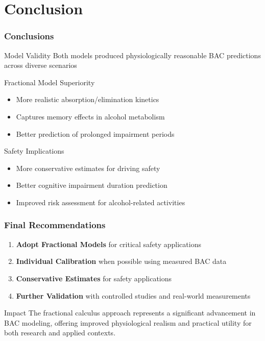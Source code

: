 \documentclass{beamer}
\begin{document}
\section{Conclusion}

\begin{frame}
\frametitle{Conclusions}
\begin{block}{Model Validity}
Both models produced physiologically reasonable BAC predictions across diverse scenarios
\end{block}

\begin{block}{Fractional Model Superiority}
\begin{itemize}
    \item More realistic absorption/elimination kinetics
    \item Captures memory effects in alcohol metabolism
    \item Better prediction of prolonged impairment periods
\end{itemize}
\end{block}

\begin{block}{Safety Implications}
\begin{itemize}
    \item More conservative estimates for driving safety
    \item Better cognitive impairment duration prediction
    \item Improved risk assessment for alcohol-related activities
\end{itemize}
\end{block}
\end{frame}

\begin{frame}
\frametitle{Final Recommendations}
\begin{enumerate}
    \item \textbf{Adopt Fractional Models} for critical safety applications
    \item \textbf{Individual Calibration} when possible using measured BAC data
    \item \textbf{Conservative Estimates} for safety applications
    \item \textbf{Further Validation} with controlled studies and real-world measurements
\end{enumerate}

\vspace{0.5cm}
\begin{alertblock}{Impact}
The fractional calculus approach represents a significant advancement in BAC modeling, offering improved physiological realism and practical utility for both research and applied contexts.
\end{alertblock}
\end{frame}
\end{document}
